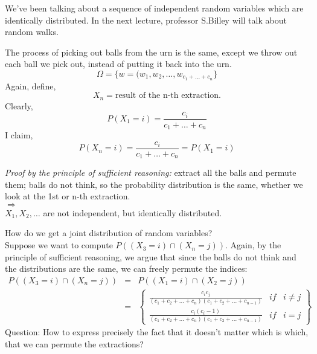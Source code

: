 We've been talking about a sequence of independent random variables 
which are identically distributed. In the next lecture, professor 
S.Billey will talk about random walks.


The process of picking out balls from the urn is the same, except
we throw out each ball we pick out, instead of putting it back into
the urn.
\begin{equation}
\Omega = \{w = (w_{1},w_{2}, \ldots, w_{c_{1}+\ldots+c_{n}} \}
\end{equation}
Again, define,
\begin{equation}
X_{n} = \mbox{result of the n-th extraction.}
\end{equation}
Clearly,
\begin{equation}
P(X_{1}=i) = \frac {c_{i}} {c_{1}+\ldots+c_{n}}
\end{equation}
I claim,
\begin{equation}
P(X_{n}=i) = \frac {c_{i}} {c_{1}+\ldots+c_{n}} = P(X_{1}=i) 
\end{equation}

{\it Proof by the principle of sufficient reasoning:} extract all the balls
and permute them; balls do not think, so the probability distribution
is the same, whether we look at the 1st or n-th extraction.\\
$\Longrightarrow$ \\
$X_{1},X_{2},\ldots$ are not independent, but identically distributed.

How do we get a joint distribution of random variables? \\
Suppose we want to compute $P((X_{3}=i) \cap (X_{n}=j))$. Again, by
the principle of sufficient reasoning, we argue that since the balls 
do not think and the distributions are the same, we can freely permute
the indices:
\begin{eqnarray*}
P((X_{3}=i) \cap (X_{n}=j)) & = & P((X_{1}=i) \cap (X_{2}=j)) \\
& = &
\left\{ \begin {array}{rcl}
\frac{c_{i}c_{j}}{(c_{1}+c_{2}+\ldots+c_{n})(c_{1}+c_{2}+\ldots+c_{n-1})}
& if & i \not = j\\
\frac{c_{i}(c_{i}-1)}{(c_{1}+c_{2}+\ldots+c_{n})(c_{1}+c_{2}+\ldots+c_{n-1})}
& if & i = j
\end{array} \right\}
\end{eqnarray*}
Question: How to express precisely the fact that it doesn't matter
which is which, that we can permute the extractions?


